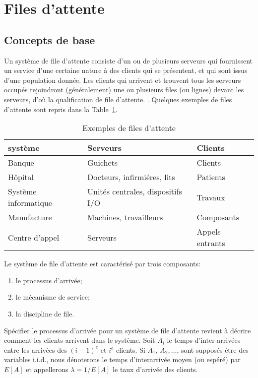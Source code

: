 \section{Files d'attente}

\subsection{Concepts de base}

Un système de file d'attente consiste d'un ou de plusieurs serveurs
qui fournissent un service d'une certaine nature à des clients qui se
présentent, et qui sont issus d'une population donnée.
Les clients qui arrivent et trouvent tous les serveurs occupés
rejoindront (généralement) une ou plusieurs files (ou lignes) devant
les serveurs, d'où la qualification de file d'attente.
.
Quelques exemples de files d'attente sont repris dans la
Table~\ref{tab:queueing}.
\begin{table}[htb]
\begin{center}
\begin{tabular}{lll}
{\bf système} & {\bf Serveurs} & {\bf Clients} \\
\hline
Banque & Guichets & Clients \\
Hôpital & Docteurs, infirmiéres, lits &  Patients \\
Système informatique & Unités centrales, dispositifs I/O & Travaux \\
Manufacture & Machines, travailleurs & Composants \\
Centre d'appel & Serveurs & Appels entrants \\
\hline
\end{tabular}
\end{center}
\caption{Exemples de files d'attente}
\label{tab:queueing}
\end{table}
Le système de file d'attente est caractérisé par trois composants:
\begin{enumerate}
\item le processus d'arrivée;
\item le mécanisme de service;
\item la discipline de file.
\end{enumerate}

Spécifier le processus d'arrivée pour un système de file d'attente
revient à décrire comment les clients arrivent dans le système. Soit
$A_i$ le temps d'inter-arrivées entre les arrivées des $(i-1)^e$ et
$i^e$ clients. Si $A_1$, $A_2,\ldots$, sont supposés être des
variables i.i.d., nous dénoterons le temps d'interarrivée moyen (ou
espéré) par $E[A]$ et appellerons $\lambda = 1/E[A]$ le taux d'arrivée
des clients.

